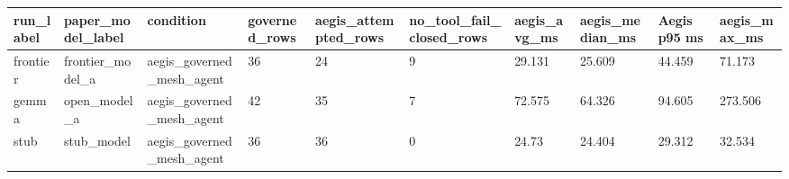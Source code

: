 \begin{tabular}{llllllllll}
 \hline
run\_label & paper\_model\_label & condition & governed\_rows & aegis\_attempted\_rows & no\_tool\_fail\_closed\_rows & aegis\_avg\_ms & aegis\_median\_ms & Aegis p95 ms & aegis\_max\_ms \\
 \hline
frontier & frontier\_model\_a & aegis\_governed\_mesh\_agent & 36 & 24 & 9 & 29.131 & 25.609 & 44.459 & 71.173 \\
gemma & open\_model\_a & aegis\_governed\_mesh\_agent & 42 & 35 & 7 & 72.575 & 64.326 & 94.605 & 273.506 \\
stub & stub\_model & aegis\_governed\_mesh\_agent & 36 & 36 & 0 & 24.73 & 24.404 & 29.312 & 32.534 \\
 \hline
\end{tabular}

